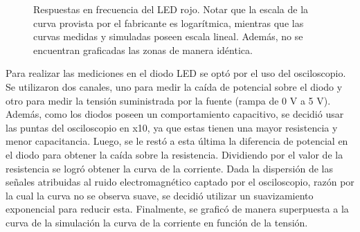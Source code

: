 \documentclass[a4paper]{article}
\begin{document}
\begin{figure}[H]%
    \centering
    \qquad
    \caption{Respuestas en frecuencia del LED rojo. Notar que la escala de la curva provista por el fabricante es logarítmica, mientras que las curvas medidas y simuladas poseen escala lineal. Además, no se encuentran graficadas las zonas de manera idéntica.}%
\end{figure}




Para realizar las mediciones en el diodo LED se optó por el uso del osciloscopio. Se utilizaron dos canales, uno para medir la caída de potencial sobre el diodo y otro para medir la tensión suministrada por la fuente (rampa de 0 V a 5 V). Además, como los diodos poseen un comportamiento capacitivo, se decidió usar las puntas del osciloscopio en x10, ya que estas tienen una mayor resistencia y menor capacitancia. Luego, se le restó a esta última la diferencia de potencial en el diodo para obtener la caída sobre la resistencia. Dividiendo por el valor de la resistencia se logró obtener la curva de la corriente. Dada la dispersión de las señales atribuidas al ruido electromagnético captado por el osciloscopio, razón por la cual la curva no se observa suave, se decidió utilizar un suavizamiento exponencial para reducir esta. Finalmente, se graficó de manera superpuesta a la curva de la simulación la curva de la corriente en función de la tensión.
\end{document}
